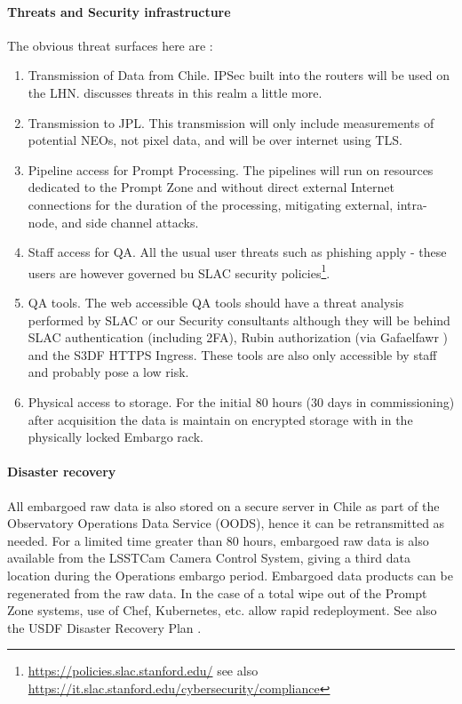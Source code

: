 \paragraph{ Threats and Security infrastructure}
The obvious threat surfaces here are :
\begin{enumerate}
\item Transmission of Data from Chile. IPSec built into the routers will be used on the \gls{LHN}.  discusses threats in this realm a little more.
\item Transmission to \gls{JPL}.  This transmission will only include measurements of potential NEOs, not pixel data, and will be over internet using \gls{TLS}.
\item Pipeline access for Prompt Processing. The pipelines will run on resources dedicated to the Prompt Zone and without direct external Internet connections for the duration of the processing, mitigating external, intra-node, and side channel attacks.
\item Staff access for \gls{QA}. All the usual user threats such as phishing apply - these users are however governed bu \gls{SLAC} security policies\footnote{\url{https://policies.slac.stanford.edu/} see also \url{https://it.slac.stanford.edu/cybersecurity/compliance}}.
\item QA tools. The web accessible QA tools should have a threat analysis performed by SLAC or our Security consultants although they will be behind SLAC authentication (including 2FA), Rubin authorization (via Gafaelfawr ) and the S3DF HTTPS Ingress. These tools are also only accessible by staff and probably pose a low risk.
\item Physical access to storage.  For the initial 80 hours (30 days in commissioning) after acquisition the data is maintain on encrypted storage with in the physically locked Embargo rack.
\end{enumerate}

\paragraph{Disaster recovery}
All embargoed raw data is also stored on a secure server in Chile as part of the Observatory \gls{Operations} Data Service (OODS), hence it can be retransmitted as needed.
For a limited time greater than 80 hours, embargoed raw data is also available from the LSSTCam \gls{Camera} Control System, giving a third data location during the Operations embargo period.
Embargoed data products can be regenerated from the raw data.
In the case of a total wipe out of the Prompt Zone systems, use of Chef, \gls{Kubernetes}, etc. allow rapid redeployment.
See also the \gls{USDF} Disaster Recovery Plan .

